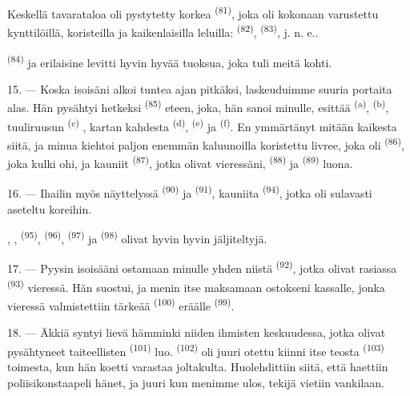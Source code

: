 Keskellä tavarataloa oli pystytetty korkea 
\textsuperscript{(81)}, joka oli kokonaan varustettu kynttilöillä, koristeilla ja
kaikenlaisilla leluilla:  \textsuperscript{(82)},
 \textsuperscript{(83)}, j. n. e..

 \textsuperscript{(84)}  ja
erilaisine  levitti hyvin hyvää tuoksua, joka tuli meitä
kohti.

\VUsaut{3.4mm}
\VUsaut{2.8mm}

15. --- Koska isoisäni alkoi tuntea ajan pitkäksi, laskeuduimme suuria portaita
alas. Hän pysähtyi hetkeksi 
\textsuperscript{(85)} eteen, joka, hän sanoi minulle, esittää
 \textsuperscript{(a)},  \textsuperscript{(b)}, tuuliruusun  \textsuperscript{(c)} , kartan kahdesta  \textsuperscript{(d)},
 \textsuperscript{(e)} ja 
\textsuperscript{(f)}. En ymmärtänyt mitään kaikesta siitä, ja minua kiehtoi
paljon enemmän kaluunoilla koristettu livree, joka oli
 \textsuperscript{(86)}, joka kulki ohi, ja kauniit
 \textsuperscript{(87)}, jotka olivat vieressäni,
 \textsuperscript{(88)} ja 
\textsuperscript{(89)} luona.

16. --- Ihailin myös näyttelyssä  \textsuperscript{(90)} ja
 \textsuperscript{(91)}, kauniita 
\textsuperscript{(94)}, jotka oli sulavasti aseteltu koreihin.

, , 
\textsuperscript{(95)},  \textsuperscript{(96)},
 \textsuperscript{(97)} ja 
\textsuperscript{(98)} olivat hyvin hyvin jäljiteltyjä.

\VUsaut{4.4mm}
\VUsaut{2.8mm}

17. --- Pyysin isoisääni ostamaan minulle yhden niistä 
\textsuperscript{(92)}, jotka olivat rasiassa 
\textsuperscript{(93)} vieressä. Hän suostui, ja menin itse maksamaan ostokseni
kassalle, jonka vieressä valmistettiin tärkeää 
\textsuperscript{(100)} eräälle  \textsuperscript{(99)}.

18. --- Äkkiä syntyi lievä hämminki niiden ihmisten keskuudessa, jotka olivat
pysähtyneet taiteellisten  \textsuperscript{(101)} luo.
 \textsuperscript{(102)} oli juuri otettu kiinni itse teosta
 \textsuperscript{(103)} toimesta, kun hän koetti varastaa
joltakulta. Huolehdittiin siitä, että haettiin poliisikonstaapeli
 hänet, ja juuri kun menimme ulos, tekijä vietiin
vankilaan.

\VUsaut{6.0mm}
\VUfilet{22mm}
